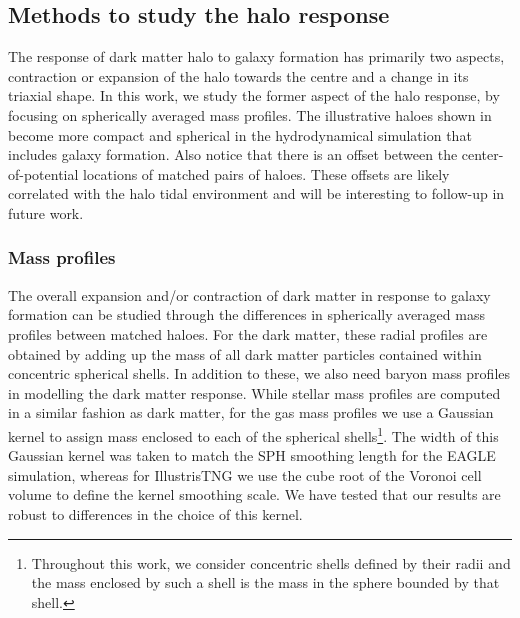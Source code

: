 \subsection{Methods to study the halo response}
\label{sec:method-ch:z0main}
The response of dark matter halo to galaxy formation has primarily two aspects, contraction or expansion of the halo towards the centre and a change in its triaxial shape. In this work, we study the former aspect of the halo response, by focusing on spherically averaged mass profiles. 
The illustrative haloes shown in  become more compact and spherical in the hydrodynamical simulation that includes galaxy formation.
Also notice that there is an offset between the center-of-potential locations of matched pairs of haloes. These offsets are likely correlated with the halo tidal environment and will be interesting to follow-up in future work.

\subsubsection{Mass profiles}
\label{subsec:massprofiles-ch:z0main}

The overall expansion and/or contraction of dark matter in response to galaxy formation can be studied through the differences in spherically averaged mass profiles between matched haloes. For the dark matter, these radial profiles are obtained by adding up the mass of all dark matter particles contained within concentric spherical shells. In addition to these, we also need baryon mass profiles in modelling the dark matter response. While stellar mass profiles are computed in a similar fashion as dark matter,
for the gas mass profiles we use a Gaussian kernel to assign mass enclosed to each of the spherical shells\footnote{Throughout this work, we consider concentric shells defined by their radii and the mass enclosed by such a shell is the mass in the sphere bounded by that shell.
}. 
The width of this Gaussian kernel was taken to match the SPH smoothing length for the EAGLE simulation, whereas for IllustrisTNG we use the cube root of the Voronoi cell volume to define the kernel smoothing scale. We have tested that our results are robust to differences in the choice of this kernel.


